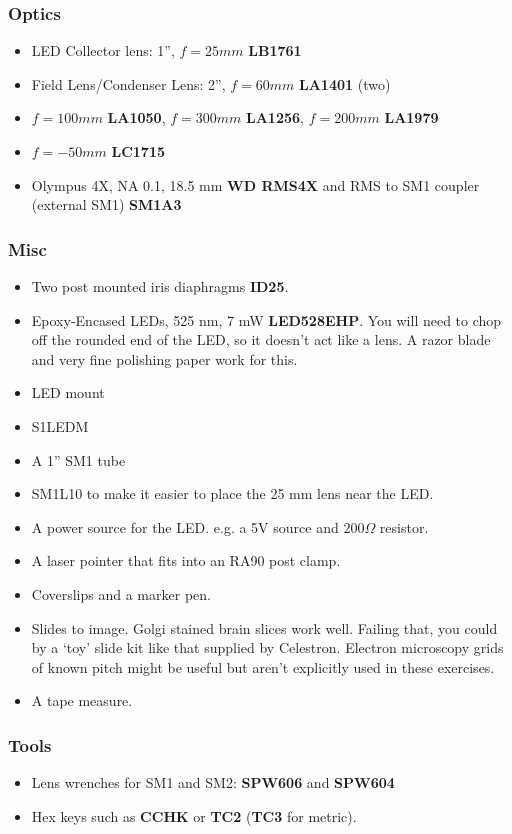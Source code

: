 \documentclass[a4paper]{report}
\begin{document}
\subsubsection{Optics}
\begin{itemize}
\item LED Collector lens: 1'', $f=25 mm$ \textbf{LB1761}
\item Field Lens/Condenser Lens: 2'', $f=60 mm$ \textbf{LA1401} (two)
\item $f=100 mm$ \textbf{LA1050}, $f=300 mm$ \textbf{LA1256}, $f=200 mm$ \textbf{LA1979}
\item $f=-50 mm$ \textbf{LC1715}
\item Olympus 4X, NA 0.1, 18.5 mm \textbf{WD RMS4X} and RMS to SM1 coupler (external SM1) \textbf{SM1A3}
\end{itemize}

\subsubsection{Misc}
\begin{itemize}
\item Two post mounted iris diaphragms \textbf{ID25}. 
\item Epoxy-Encased LEDs, 525 nm, 7 mW \textbf{LED528EHP}. 
You will need to chop off the rounded end of the LED, so it doesn't act like a lens.  
A razor blade and very fine polishing paper work for this.
\item LED mount \item{S1LEDM}
\item A 1'' SM1 tube \item{SM1L10} to make it easier to place the 25 mm lens near the LED.
\item A power source for the LED. e.g. a 5V source and $200\Omega$ resistor. 
\item A laser pointer that fits into an RA90 post clamp. 
\item Coverslips and a marker pen.
\item Slides to image. Golgi stained brain slices work well. 
Failing that, you could by a `toy' slide kit like that supplied by Celestron. 
Electron microscopy grids of known pitch might be useful but aren't explicitly used in these exercises.
\item A tape measure. 
\end{itemize}

\subsubsection{Tools}
\begin{itemize}
\item Lens wrenches for SM1 and SM2: \textbf{SPW606} and \textbf{SPW604}
\item Hex keys such as \textbf{CCHK} or \textbf{TC2} (\textbf{TC3} for metric). 
\end{itemize}
\end{document}
